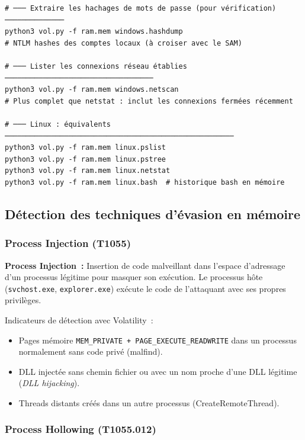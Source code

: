 \begin{lstlisting}[style=StyleTerminal,
  caption={Commandes Volatility~3 essentielles pour l'investigation},
  label={lst:volatility3}]
# ─── Extraire les hachages de mots de passe (pour vérification) ──────────────
python3 vol.py -f ram.mem windows.hashdump
# NTLM hashes des comptes locaux (à croiser avec le SAM)

# ─── Lister les connexions réseau établies ───────────────────────────────────
python3 vol.py -f ram.mem windows.netscan
# Plus complet que netstat : inclut les connexions fermées récemment

# ─── Linux : équivalents ──────────────────────────────────────────────────────
python3 vol.py -f ram.mem linux.pslist
python3 vol.py -f ram.mem linux.pstree
python3 vol.py -f ram.mem linux.netstat
python3 vol.py -f ram.mem linux.bash  # historique bash en mémoire
\end{lstlisting}

\subsection{Détection des techniques d'évasion en mémoire}

\subsubsection{Process Injection (T1055)}

\begin{boxdef}
\textbf{Process Injection~:} Insertion de code malveillant dans l'espace
d'adressage d'un processus légitime pour masquer son exécution. Le processus
hôte (\texttt{svchost.exe}, \texttt{explorer.exe}) exécute le code de
l'attaquant avec ses propres privilèges.
\end{boxdef}

Indicateurs de détection avec Volatility~:
\begin{itemize}
  \item Pages mémoire \texttt{MEM\_PRIVATE + PAGE\_EXECUTE\_READWRITE}
        dans un processus normalement sans code privé (malfind).
  \item DLL injectée sans chemin fichier ou avec un nom proche d'une DLL
        légitime (\textit{DLL hijacking}).
  \item Threads distants créés dans un autre processus (CreateRemoteThread).
\end{itemize}

\subsubsection{Process Hollowing (T1055.012)}

